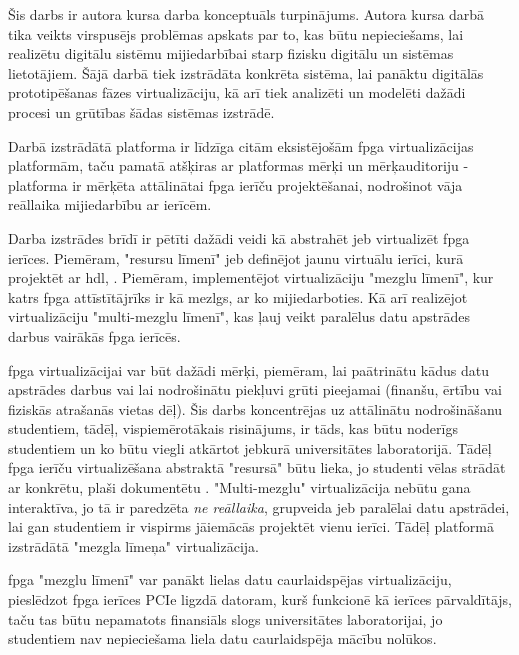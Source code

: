 Šis darbs ir autora kursa darba konceptuāls turpinājums. Autora kursa darbā tika
veikts virspusējs problēmas apskats par to, kas būtu nepieciešams, lai realizētu
digitālu sistēmu mijiedarbībai starp fizisku digitālu 
un sistēmas lietotājiem. Šājā darbā tiek izstrādāta konkrēta sistēma, lai
panāktu digitālās  prototipēšanas fāzes
virtualizāciju, kā arī tiek analizēti un modelēti dažādi procesi un grūtības
šādas sistēmas izstrādē.
\cite{VeinbahsKrisjanis2021}

Darbā izstrādātā platforma ir līdzīga citām eksistējošām \gls{fpga}
virtualizācijas platformām, taču pamatā atšķiras ar platformas mērķi un
mērķauditoriju - platforma ir mērķēta attālinātai \gls{fpga} ierīču
 projektēšanai, nodrošinot vāja reāllaika
mijiedarbību ar ierīcēm.

Darba izstrādes brīdī ir pētīti dažādi veidi kā abstrahēt jeb virtualizēt
\gls{fpga} ierīces. \cite[para. I]{VaishnavAnuj2018} Piemēram, "resursu līmenī"
jeb definējot jaunu virtuālu ierīci, kurā projektēt 
ar \gls{hdl}, \cite[para III]{VaishnavAnuj2018}. Piemēram, implementējot
virtualizāciju "mezglu līmenī", kur katrs \gls{fpga} attīstītājrīks ir kā
mezlgs, ar ko mijiedarboties. \cite[para IV]{VaishnavAnuj2018} Kā arī realizējot
virtualizāciju "multi-mezglu līmenī", kas ļauj veikt paralēlus datu apstrādes
darbus vairākās \gls{fpga} ierīcēs. \cite[para V]{VaishnavAnuj2018}

\gls{fpga} virtualizācijai var būt dažādi mērķi, piemēram, lai paātrinātu kādus
datu apstrādes darbus vai lai nodrošinātu piekļuvi grūti pieejamai
 (finanšu, ērtību vai fiziskās atrašanās vietas dēļ).
Šis darbs koncentrējas uz attālinātu  nodrošināšanu
studentiem, tādēļ, vispiemērotākais risinājums, ir tāds, kas būtu noderīgs
studentiem un ko būtu viegli atkārtot jebkurā universitātes laboratorijā. Tādēļ
\gls{fpga} ierīču virtualizēšana abstraktā "resursā" būtu lieka, jo studenti
vēlas strādāt ar konkrētu, plaši dokumentētu .
"Multi-mezglu" virtualizācija nebūtu gana interaktīva, jo tā ir paredzēta
\textit{ne reāllaika}, grupveida jeb paralēlai datu apstrādei, lai gan
studentiem ir vispirms jāiemācās projektēt vienu ierīci. Tādēļ platformā
izstrādātā "mezgla līmeņa" virtualizācija. 

\gls{fpga} "mezglu līmenī" var panākt lielas datu caurlaidspējas virtualizāciju,
pieslēdzot \gls{fpga} ierīces PCIe ligzdā datoram, kurš funkcionē kā ierīces
pārvaldītājs, taču tas būtu nepamatots finansiāls slogs universitātes
laboratorijai, jo studentiem nav nepieciešama liela datu caurlaidspēja mācību
nolūkos. \cite{WangWei2013} \cite{AsiaticiMikhail2017} 

